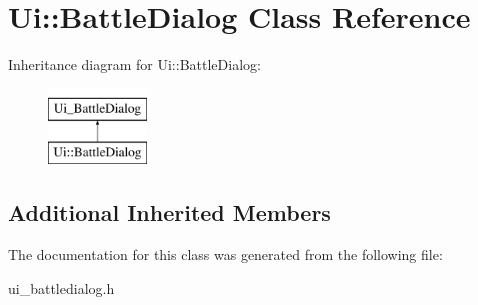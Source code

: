 \hypertarget{class_ui_1_1_battle_dialog}{}\section{Ui\+:\+:Battle\+Dialog Class Reference}
\label{class_ui_1_1_battle_dialog}
Inheritance diagram for Ui\+:\+:Battle\+Dialog\+:\begin{figure}[H]
\begin{center}
\leavevmode
\includegraphics[height=2.000000cm]{class_ui_1_1_battle_dialog}
\end{center}
\end{figure}
\subsection*{Additional Inherited Members}


The documentation for this class was generated from the following file\+:\begin{DoxyCompactItemize}
\item 
ui\+\_\+battledialog.\+h\end{DoxyCompactItemize}
